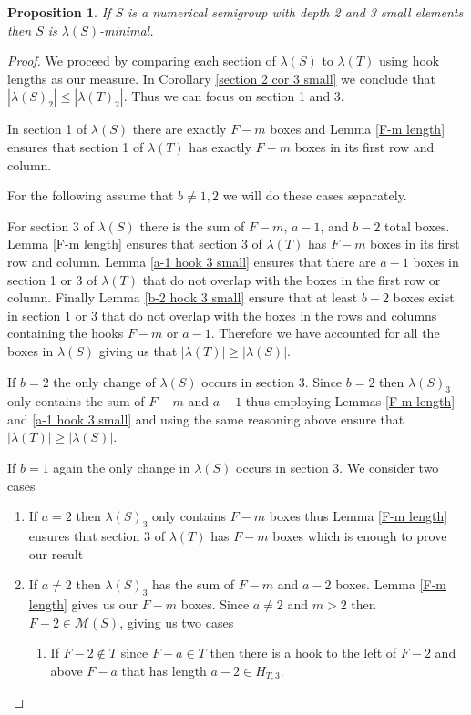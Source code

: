 \documentclass[11pt,letterpaper]{article}
\newtheorem{prop}[thm]{Proposition}
\theoremstyle{definition}
\begin{document}
\begin{prop}
    If $S$ is a numerical semigroup with depth 2 and 3 small elements then $S$ is $\lambda(S)$-minimal.
\end{prop}

\begin{proof}
    We proceed by comparing each section of $\lambda(S)$ to $\lambda(T)$ using hook lengths as our measure. In Corollary \ref{section 2 cor 3 small} we conclude that $|\lambda(S)_2|\leq |\lambda(T)_2|$. Thus we can focus on section 1 and 3. 
    
    In section 1 of $\lambda(S)$ there are exactly $F-m$ boxes and Lemma \ref{F-m length} ensures that section 1 of $\lambda(T)$ has exactly $F-m$ boxes in its first row and column. 

    For the following assume that $b\neq 1,2$ we will do these cases separately. 
    
    For section 3 of $\lambda(S)$ there is the sum of $F-m$, $a-1$, and $b-2$ total boxes. Lemma \ref{F-m length} ensures that section 3 of $\lambda(T)$ has $F-m$ boxes in its first row and column. Lemma \ref{a-1 hook 3 small} ensures that there are $a-1$ boxes in section 1 or 3 of $\lambda(T)$ that do not overlap with the boxes in the first row or column. Finally Lemma \ref{b-2 hook 3 small} ensure that at least $b-2$ boxes exist in section 1 or 3 that do not overlap with the boxes in the rows and columns containing the hooks $F-m$ or $a-1$. Therefore we have accounted for all the boxes in $\lambda(S)$ giving us that $|\lambda(T)|\geq |\lambda(S)|$.

    If $b=2$ the only change of $\lambda(S)$ occurs in section 3. Since $b=2$ then $\lambda(S)_3$ only contains the sum of $F-m$ and $a-1$ thus employing Lemmas \ref{F-m length} and \ref{a-1 hook 3 small} and using the same reasoning above ensure that $|\lambda(T)|\geq |\lambda(S)|$. 

    If $b=1$ again the only change in $\lambda(S)$ occurs in section 3. We consider two cases
    \begin{enumerate}
        \item If $a=2$ then $\lambda(S)_3$ only contains $F-m$ boxes thus Lemma \ref{F-m length} ensures that section 3 of $\lambda(T)$ has $F-m$ boxes which is enough to prove our result

        \item If $a\neq 2$ then $\lambda(S)_3$ has the sum of $F-m$ and $a-2$ boxes. Lemma \ref{F-m length} gives us our $F-m$ boxes. Since $a\neq 2$ and $m>2$ then $F-2\in\mathcal{M}(S)$, giving us two cases
        \begin{enumerate}
            \item If $F-2\notin T$ since $F-a\in T$ then there is a hook to the left of $F-2$ and above $F-a$ that has length $a-2\in H_{T,3}$. 


\end{enumerate}
\end{enumerate}
\end{proof}
\end{document}
